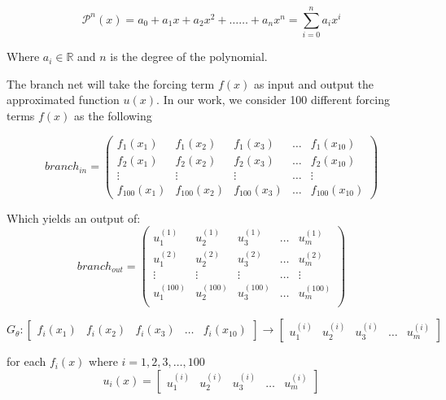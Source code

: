 \documentclass[a4paper,12pt]{article}
\theoremstyle{definition}
\begin{document}
\begin{equation}
    \mathcal{P}^n(x) =   a_0 + a_1 x + a_2 x^2 + \dots \dots + a_n x^n = \sum_{i=0}^{n} a_i x^i
\end{equation} 

Where $a_i \in \mathbb{R}$ and $n$ is the degree of the polynomial.

The branch net will take the forcing term $f(x)$ as input and output the approximated function $u(x)$.
In our work, we consider 100 different forcing terms $f(x)$ as the following 
  
\begin{equation}
branch_{in} =
\begin{pmatrix}
f_1(x_1) & f_1(x_2) & f_1(x_3) & \dots & f_1(x_{10})\\
f_2(x_1) & f_2(x_2) & f_2(x_3) & \dots & f_2(x_{10})\\
\vdots & \vdots & \vdots & \dots & \vdots\\
f_{100}(x_1) & f_{100}(x_2) & f_{100}(x_3) & \dots & f_{100}(x_{10})
\end{pmatrix}
\end{equation}

Which yields an output of: 
\begin{equation}
branch_{out} = \begin{pmatrix}
u^{(1)}_1 & u^{(1)}_2 & u^{(1)}_3 & \dots & u^{(1)}_m\\
u^{(2)}_1 & u^{(2)}_2 & u^{(2)}_3 & \dots & u^{(2)}_m\\
\vdots & \vdots & \vdots & \dots & \vdots\\
u^{(100)}_1 & u^{(100)}_2 & u^{(100)}_3 & \dots & u^{(100)}_m\\
\end{pmatrix}
\end{equation}

\begin{equation}
G_{\theta}:
\begin{bmatrix}
f_i(x_1) & f_i(x_2) & f_i(x_3) & \dots & f_i(x_{10})
\end{bmatrix}
\rightarrow
\begin{bmatrix}
u^{(i)}_1 & u^{(i)}_2 & u^{(i)}_3 & \dots & u^{(i)}_m
\end{bmatrix}
\end{equation}

for each $f_i(x)$ where $i=1, 2, 3, \dots, 100$
\begin{equation}
u_i(x) =
\begin{bmatrix}
u^{(i)}_1 & u^{(i)}_2 & u^{(i)}_3 & \dots & u^{(i)}_m
\end{bmatrix}
\end{equation}
\end{document}
